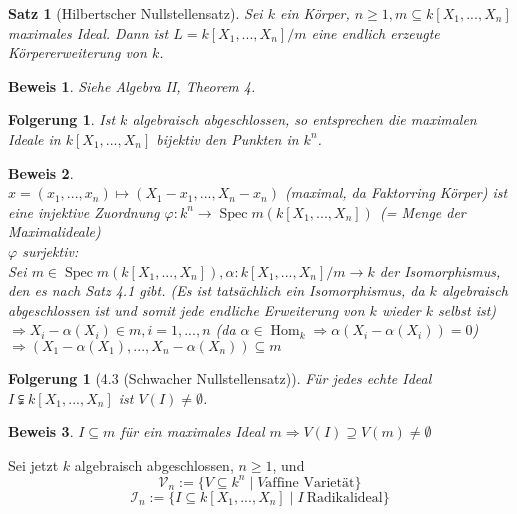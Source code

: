 \documentclass[a4paper,12pt]{report}
\theoremstyle{break}
\newtheorem{Satz}{Satz}
\newtheorem{Folg}[Def]{Folgerung}
\theoremstyle{nonumberbreak}
\newtheorem{nnFolg}{Folgerung}
\theoremstyle{nonumberplain}
\newtheorem{Bew}{Beweis}
\begin{document}
\begin{Satz}[Hilbertscher Nullstellensatz]
Sei  $k$ ein Körper, $n\geq 1, m\subseteq k[X_1,...,X_n]$ maximales Ideal. Dann ist $L=k[X_1,...,X_n]/m$ eine endlich erzeugte Körpererweiterung von $k$.
\end{Satz}
\begin{Bew} Siehe Algebra II, Theorem 4. \end{Bew}
\begin{Folg}
Ist $k$ algebraisch abgeschlossen, so entsprechen die maximalen Ideale in $k[X_1,...,X_n]$ bijektiv den Punkten in $k^n$.
\end{Folg}
\begin{Bew}~\\
$x=(x_1,...,x_n)\mapsto (X_1-x_1,...,X_n-x_n)$ (maximal, da Faktorring Körper) ist eine injektive Zuordnung $\varphi: k^n \rightarrow\operatorname{Spec}m(k[X_1,...,X_n])~~$(= Menge der Maximalideale)\\
$\varphi$ surjektiv:\\
Sei $m\in\operatorname{Spec} m (k[X_1,...,X_n]), \alpha: k[X_1,...,X_n]/m \rightarrow k$ der Isomorphismus, den es nach Satz 4.1 gibt. (Es ist tatsächlich ein Isomorphismus, da $k$ algebraisch abgeschlossen ist und somit jede endliche Erweiterung von $k$ wieder $k$ selbst ist)\\
$\Rightarrow X_i - \alpha(X_i)\in m, i= 1,...,n$ (da $\alpha\in \operatorname{Hom}_k\Rightarrow \alpha(X_i-\alpha(X_i))=0$)\\
$\Rightarrow (X_1-\alpha(X_1),...,X_n-\alpha(X_n)) \subseteq m$
\end{Bew}
\begin{nnFolg}[4.3 (Schwacher Nullstellensatz)]
Für jedes echte Ideal $I\subsetneqq k[X_1,...,X_n]$ ist $V(I)\neq \emptyset$.
\end{nnFolg}
\begin{Bew}
$I\subseteq m$ für ein maximales Ideal $m \Rightarrow V(I) \supseteq V(m) \neq \emptyset$
\end{Bew}
Sei jetzt  $k$ algebraisch abgeschlossen, $n\geq 1$, und
$$\mathcal{V}_n:= \{V\subseteq k^n\mid V \textrm{affine~Varietät}\}$$
$$\mathcal{I}_n:=\{I\subseteq k[X_1,...,X_n]\mid I ~ \textrm{Radikalideal}\}$$
\end{document}
